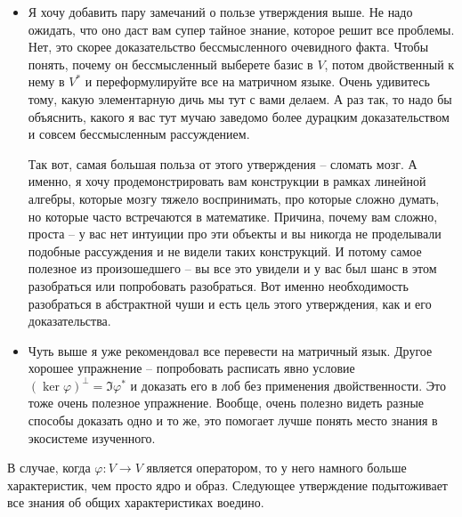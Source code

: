 \begin{itemize}
\item Я хочу добавить пару замечаний о пользе утверждения выше.
Не надо ожидать, что оно даст вам супер тайное знание, которое решит все проблемы.
Нет, это скорее доказательство бессмысленного очевидного факта.
Чтобы понять, почему он бессмысленный выберете базис в $V$, потом двойственный к нему в $V^*$ и переформулируйте все на матричном языке.
Очень удивитесь тому, какую элементарную дичь мы тут с вами делаем.
А раз так, то надо бы объяснить, какого я вас тут мучаю заведомо более дурацким доказательством и совсем бессмысленным рассуждением.

Так вот, самая большая польза от этого утверждения -- сломать мозг.
А именно, я хочу продемонстрировать вам конструкции в рамках линейной алгебры, которые мозгу тяжело воспринимать, про которые сложно думать, но которые часто встречаются в математике.
Причина, почему вам сложно, проста -- у вас нет интуиции про эти объекты и вы никогда не проделывали подобные рассуждения и не видели таких конструкций.
И потому самое полезное из произошедшего -- вы все это увидели и у вас был шанс в этом разобраться или попробовать разобраться.
Вот именно необходимость разобраться в абстрактной чуши и есть цель этого утверждения, как и его доказательства.

\item Чуть выше я уже рекомендовал все перевести на матричный язык.
Другое хорошее упражнение -- попробовать расписать явно условие $(\ker \varphi)^\bot = \Im \varphi^*$ и доказать его в лоб без применения двойственности.
Это тоже очень полезное упражнение.
Вообще, очень полезно видеть разные способы доказать одно и то же, это помогает лучше понять место знания в экосистеме изученного.
\end{itemize}

В случае, когда $\varphi\colon V\to V$ является оператором, то у него намного больше характеристик, чем просто ядро и образ.
Следующее утверждение подытоживает все знания об общих характеристиках воедино.

